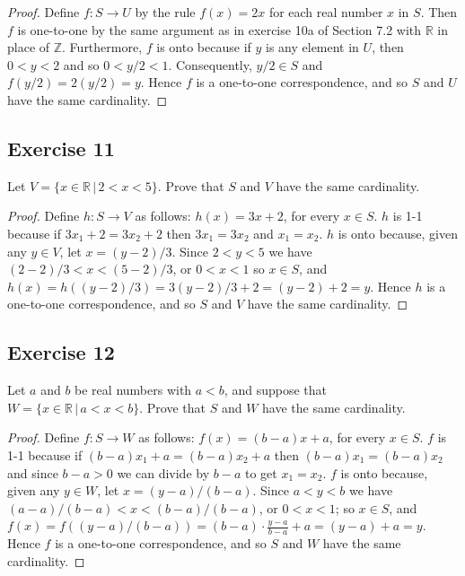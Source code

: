 \documentclass[14pt]{extarticle}
\newcommand{\R}{\mathbb{R}}
\newcommand{\Z}{\mathbb{Z}}
\begin{document}
\begin{proof}
    Define \(f: S \to U\) by the rule \(f(x) = 2x\) for each real number $x$ in $S$. Then $f$ is one-to-one by the same
    argument as in exercise 10a of Section 7.2 with $\R$ in place of $\Z$. Furthermore, $f$ is onto because if $y$ is
    any element in $U$, then \(0 < y < 2\) and so \(0 < y/2 < 1\). Consequently, \(y/2 \in S\) and \(f(y/2)=2(y/2) = y\).
    Hence $f$ is a one-to-one correspondence, and so $S$ and $U$ have the same cardinality.
\end{proof}

\subsection{Exercise 11}
Let \(V = \{x \in \R \,|\, 2 < x < 5\}\). Prove that $S$ and $V$ have the same cardinality.

\begin{proof}
    Define \(h: S \to V\) as follows: \(h(x) = 3x + 2\), for every \(x \in S\). $h$ is 1-1 because if \(3x_1 + 2 = 3x_2
    + 2\) then \(3x_1 = 3x_2\) and \(x_1 = x_2\). $h$ is onto because, given any \(y \in V\), let \(x = (y-2)/3\). Since
    \(2 < y < 5\) we have \((2-2)/3 < x < (5-2)/3\), or \(0 < x < 1\) so \(x \in S\), and \(h(x) = h((y-2)/3) = 3(y-2)/3+2
    = (y-2)+2 = y\). Hence $h$ is a one-to-one correspondence, and so $S$ and $V$ have the same cardinality.
\end{proof}

\subsection{Exercise 12}
Let $a$ and $b$ be real numbers with $a < b$, and suppose that \(W = \{x \in \R \,|\, a < x < b\}\). Prove that $S$
and $W$ have the same cardinality.

\begin{proof}
    Define \(f: S \to W\) as follows: \(f(x) = (b-a)x + a\), for every \(x \in S\). $f$ is 1-1 because if \((b-a)x_1 + a
    = (b-a)x_2 + a\) then \((b-a)x_1 = (b-a)x_2\) and since \(b-a>0\) we can divide by \(b-a\) to get \(x_1 = x_2\). $f$
    is onto because, given any \(y \in W\), let \(x = (y-a)/(b-a)\). Since \(a < y < b\) we have \((a-a)/(b-a) < x < (b-
    a)/(b-a)\), or \(0 < x < 1\); so \(x \in S\), and \(f(x) = f((y-a)/(b-a))=(b-a)\cdot\frac{y-a}{b-a}+a = (y-a)+a = y\).
    Hence $f$ is a one-to-one correspondence, and so $S$ and $W$ have the same cardinality.
\end{proof}
\end{document}
